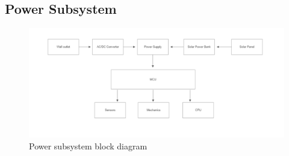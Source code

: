 \subsection{Power Subsystem}
\label{sec:power_subsystem}
\begin{figure}[H]
    \centering
    \caption{Power subsystem block diagram}
    \includegraphics[width=\textwidth]{images/PowerSystemBlock.png}
\end{figure}